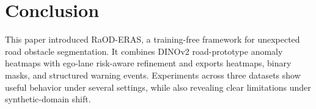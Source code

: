 \documentclass[runningheads]{llncs}
\begin{document}
\section{Conclusion}

This paper introduced RaOD-ERAS, a training-free framework for unexpected road obstacle segmentation. It combines DINOv2 road-prototype anomaly heatmaps with ego-lane risk-aware refinement and exports heatmaps, binary masks, and structured warning events. Experiments across three datasets show useful behavior under several settings, while also revealing clear limitations under synthetic-domain shift.




\end{document}
